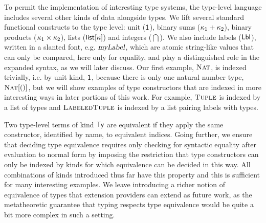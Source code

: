 \documentclass[9pt,preprint]{sigplanconf}
\begin{document}
To permit the implementation of interesting type systems, the type-level language includes several other kinds of data alongside types. We lift several  standard functional constructs to the type level: unit ($\textsf{1}$), binary sums ($\kappa_1 + \kappa_2$), binary products ($\kappa_1 \times \kappa_2$), lists ($\textsf{list}[\kappa]$) and integers ($\dint$). We also include labels ($\textsf{Lbl}$), written in a slanted font, e.g. $\textsl{myLabel}$, which are atomic string-like values that can only be compared, here only for equality, and play a distinguished role in the expanded syntax, as we will later discuss. Our first example, $\textsc{Nat}$, is indexed trivially, i.e. by unit kind, $\textsf{1}$, because there is only one natural number type, $\textsc{Nat}[()]$, but we will show examples of type constructors that are indexed in more interesting ways in later portions of this work. For example, $\textsc{Tuple}$ is indexed by a list of types and $\textsc{LabeledTuple}$ is indexed by a list pairing labels with types.  

Two type-level terms of kind $\textsf{Ty}$ are equivalent if they apply the same constructor, identified by name, to equivalent indices. Going further, we ensure that deciding type equivalence requires only checking for syntactic equality after evaluation to normal form by imposing the restriction that type constructors can only be indexed by kinds for which equivalence can be decided in this way. All combinations of kinds introduced thus far  have this property and this is sufficient for many interesting examples. We leave  introducing a richer notion of  equivalence of types that  extension providers can extend as future work, as the metatheoretic guarantee that typing respects type equivalence would be quite a bit more complex in such a setting.%
\end{document}
